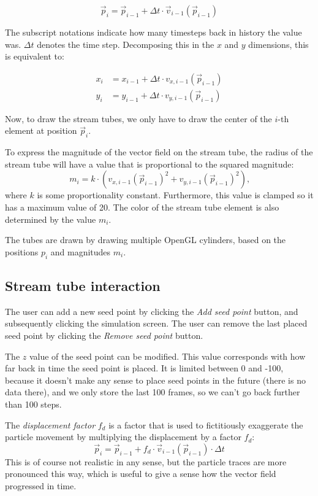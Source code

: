 \[
	\vec{p}_i = 
	\vec{p}_{i-1} + \Delta t \cdot \vec{v}_{i-1}\left( \vec{p}_{i-1} \right)
\]

The subscript notations indicate how many timesteps back in history the value was. \(\Delta t\) denotes the time step.
Decomposing this in the \(x\) and \(y\) dimensions, this is equivalent to:

\begin{align*}
	x_i &= x_{i-1} + \Delta t \cdot v_{x, i-1}\left( \vec{p}_{i-1} \right) \\
	y_i &= y_{i-1} + \Delta t \cdot v_{y, i-1}\left( \vec{p}_{i-1} \right)
\end{align*}

Now, to draw the stream tubes, we only have to draw the center of the \(i\)-th element at position \(\vec{p}_i\).

To express the magnitude of the vector field on the stream tube, the radius of the stream tube will have a value that is proportional to the squared magnitude:
\[
	m_i = k\cdot(v_{x, i-1}(\vec{p}_{i-1})^2 + v_{y, i-1}(\vec{p}_{i-1})^2)\text{,}
\]
where \(k\) is some proportionality constant.
Furthermore, this value is clamped so it has a maximum value of 20.
The color of the stream tube element is also determined by the value \(m_i\).

The tubes are drawn by drawing multiple OpenGL cylinders, based on the positions \(p_i\) and magnitudes \(m_i\).

\subsection{Stream tube interaction}
The user can add a new seed point by clicking the \emph{Add seed point} button, and subsequently clicking the simulation screen.
The user can remove the last placed seed point by clicking the \emph{Remove seed point} button.

The \(z\) value of the seed point can be modified.
This value corresponds with how far back in time the seed point is placed.
It is limited between 0 and -100, because it doesn't make any sense to place seed points in the future (there is no data there), and we only store the last 100 frames, so we can't go back further than 100 steps.

The \emph{displacement factor} \(f_d\) is a factor that is used to fictitiously exaggerate the particle movement by multiplying the displacement by a factor \(f_d\):
\[
	\vec{p}_i = 
	\vec{p}_{i-1} + f_d \cdot \vec{v}_{i-1}\left( \vec{p}_{i-1} \right) \cdot \Delta t
\]
This is of course not realistic in any sense, but the particle traces are more pronounced this way, which is useful to give a sense how the vector field progressed in time.

